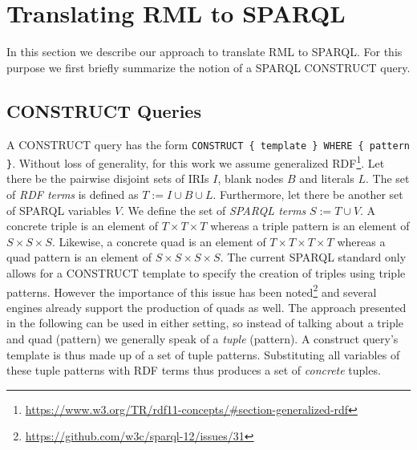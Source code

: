\section{Translating RML to SPARQL}
\label{sec:rml-to-sparql}
In this section we describe our approach to translate RML to SPARQL.
For this purpose we first briefly summarize the notion of a SPARQL CONSTRUCT query.

\subsection{CONSTRUCT Queries}
A CONSTRUCT query has the form \lstinline|CONSTRUCT { template } WHERE { pattern }|.
Without loss of generality, for this work we assume generalized RDF\footnote{\url{https://www.w3.org/TR/rdf11-concepts/\#section-generalized-rdf}}.
Let there be the pairwise disjoint sets of IRIs $I$, blank nodes $B$ and literals $L$.
The set of \emph{RDF terms} is defined as $T := I \cup B \cup L$. Furthermore, let there be another set of SPARQL variables $V$. We define the set of \emph{SPARQL terms} $S := T \cup V$.
A {concrete} triple is an element of $T \times T \times T$ whereas a triple pattern is an element of $S \times S \times S$.
Likewise, a {concrete} quad is an element of $T \times T \times T \times T$ whereas a quad pattern is an element of $S \times S \times S \times S$.
The current SPARQL standard only allows for a CONSTRUCT template to specify the creation of triples using triple patterns.
However the importance of this issue has been noted\footnote{\url{https://github.com/w3c/sparql-12/issues/31}}
and several engines already support the production of quads as well.
The approach presented in the following can be used in either setting, so instead of talking about a triple and quad (pattern) we generally speak of a \emph{tuple} (pattern).
A construct query's template is thus made up of a set of tuple patterns. Substituting all variables of these tuple patterns with RDF terms thus produces a set of \emph{concrete} tuples.


